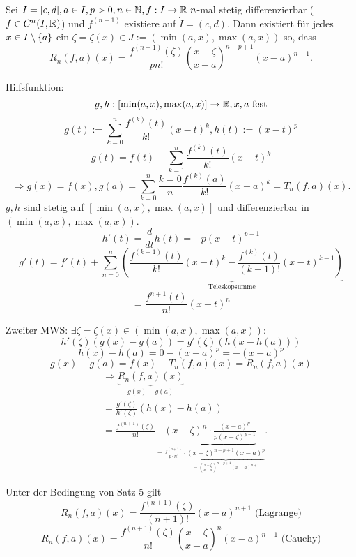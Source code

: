 \documentclass[../ana2.tex]{subfiles}
\begin{document}
\begin{satz}
    Sei \(I = [c,d], a\in I, p > 0, n\in\mathbb{N}, 
    f:I\rightarrow \mathbb{R}\ n\)-mal stetig differenzierbar 
    (\( f \in C^n(I,\mathbb{R}) \)) und \( f^{(n+1)} \) 
    existiere auf \( \dot{I} = (c,d) \). Dann existiert für 
    jedes \( x\in I \setminus \{a\} \) ein 
    \( \zeta = \zeta(x) \in J := (\min(a,x), \max(a,x)) \) 
    so, dass     
    \[ R_n(f,a)(x) = \frac{f^{(n+1)}(\zeta)}{ pn! } 
    \left( \frac{x - \zeta}{x - a} \right)^{n-p+1} (x-a)^{n+1}. \]
\end{satz}
\begin{bew}
    Hilfsfunktion: 
    \[ g,h:[\min(a,x), \max(a,x)]\rightarrow \mathbb{R}, x,a \text{ fest} \]
    \[ g(t) := \sum_{k=0}^n \frac{f^{(k)}(t)}{k!} (x-t)^k, 
    h(t) := (x-t)^p \]
    \[ g(t) = f(t) - \sum_{k=1}^n \frac{f^{(k)}(t)}{k!} (x-t)^k \]
    \[ \Rightarrow g(x) = f(x), 
    g(a) = \sum_{k=0}^n \frac{k=0}{n} \frac{f^{(k)}(a)}{k!} 
    (x-a)^k = T_n(f,a)(x).\]
    \( g, h \) sind stetig auf \( [\min(a,x), \max(a,x)] \) und
    differenzierbar in \( (\min(a,x), \max(a,x)) \).
    \[ h'(t) = \frac{d}{dt} h(t) = -p(x-t)^{p-1} \]
    \[ g'(t) = f'(t) + \sum_{n=0}^{n} 
    \underbrace{\left( \frac{f^{(k+1)}(t)}{k!} (x-t)^k
    - \frac{f^{(k)}(t)}{(k-1)!} (x-t)^{k-1} \right)}_{\text{Teleskopsumme}} \]
    \[ = \frac{f^{n+1}(t)}{n!}(x-t)^n \]

    Zweiter MWS: \( \exists \zeta = \zeta(x) 
    \in (\min(a,x), \max(a,x)) \):
    \[ h'(\zeta)(g(x) - g(a)) = g'(\zeta)(h(x - h(a))) \]
    \[ h(x) - h(a) = 0 - (x-a)^p = -(x-a)^p \]
    \[ g(x) - g(a) = f(x) - T_n(f,a)(x) = R_n(f,a)(x) \]
    \begin{align*}
        &\Rightarrow \underbrace{R_n(f,a)(x)}_{g(x)-g(a)} \\
        &= \frac{g'(\zeta)}{h'(\zeta)}(h(x)-h(a)) \\
        &= \frac{f^{(n+1)}(\zeta)}{n!}
        \underbrace{(x-\zeta)^n \cdot \frac{(x-a)^p}{p(x-\zeta)^{p-1}}}_
        {= \frac{f^{(n+1)}}{p \cdot n!} 
        \cdot \underbrace{(x-\zeta)^{n-p+1}(x-a)^p}_
        {= \left( \frac{x-\zeta}{x-a} \right)^{n-p+1} (x-a)^{n+1}}}.
    \end{align*}
\end{bew}
\begin{kor}
    Unter der Bedingung von Satz 5 gilt 
    \[ R_n(f,a)(x) = \frac{f^{(n+1)}(\zeta)}{(n+1)!} (x-a)^{n+1} \text{ (Lagrange)} \]
    \[ R_n(f,a)(x) = \frac{f^{(n+1)}(\zeta)}{n!} 
    \left( \frac{x- \zeta}{x-a} \right)^n (x-a)^{n+1} \text{ (Cauchy)} \]
\end{kor}
\end{document}
